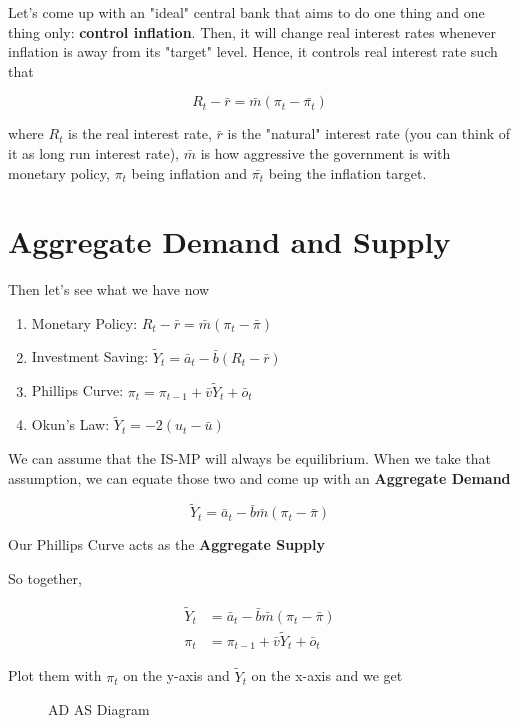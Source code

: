 \documentclass[11pt]{scrartcl}
\newcommand{\og}{\ensuremath{\tilde{Y}}}
\begin{document}
Let's come up with an "ideal" central bank that aims to do one thing and one thing only: \textbf{control inflation}. Then, it will change real interest rates whenever inflation is away from its "target" level. Hence, it controls real interest rate such that

\[R_t - \bar{r} = \bar{m} (\pi_t - \bar{\pi_t}) \]

where $R_t$ is the real interest rate, $\bar{r}$ is the "natural" interest rate (you can think of it as long run interest rate), $\bar{m}$ is how aggressive the government is with monetary policy, $\pi_t$ being inflation and $\bar{\pi_t}$ being the inflation target.

\section{Aggregate Demand and Supply}

Then let's see what we have now

\begin{enumerate}
\item Monetary Policy: $R_t - \bar{r} = \bar{m} (\pi_t - \bar{\pi})$
\item Investment Saving: $\og_t = \bar{a}_t - \bar{b} (R_t - \bar{r})$
\item Phillips Curve: $\pi_t = \pi_{t-1} + \bar{v} \og_t + \bar{o}_t$ 
\item Okun's Law: $\og_t = -2 (u_t - \bar{u})$
\end{enumerate}

We can assume that the IS-MP will always be equilibrium. When we take that assumption, we can equate those two and come up with an \textbf{Aggregate Demand}

\[\og_t = \bar{a}_t - \bar{b} \bar{m} (\pi_t - \bar{\pi} ) \]

Our Phillips Curve acts as the \textbf{Aggregate Supply}

So together,

\begin{align*}
\og_t &= \bar{a}_t - \bar{b} \bar{m} (\pi_t - \bar{\pi} ) \\
\pi_t &= \pi_{t-1} + \bar{v} \og_t + \bar{o}_t
\end{align*}

Plot them with $\pi_t$ on the y-axis and $\og_t$ on the x-axis and we get

\begin{figure}[H]
\centering
{}
\caption{\color{blue}AD \color{black} AS Diagram}
\end{figure}
\end{document}
